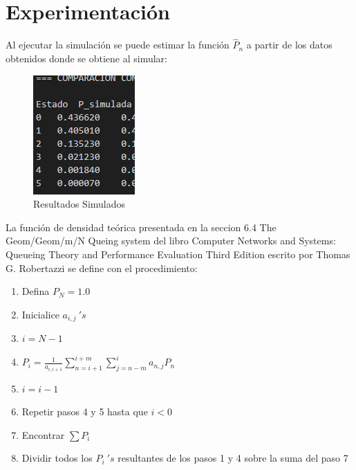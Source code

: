 \documentclass{article}
\begin{document}


\section{Experimentación}\label{sec:exp}

Al ejecutar la simulación se puede estimar la función $\hat P_n$ a partir de los datos obtenidos donde se obtiene al simular:
\begin{figure}[H]
    \centering
    \includegraphics[width=0.5\linewidth]{images/imageGeoGeoMCalc.png}
    \caption{Resultados Simulados}
    \label{fig:enter-label}
\end{figure}

La función de densidad teórica presentada en la seccion 6.4 The Geom/Geom/m/N Queing system del libro Computer Networks and Systems: Queueing Theory and Performance Evaluation Third Edition escrito por Thomas G. Robertazzi se define con el procedimiento:

\begin{enumerate}
    \item Defina $P_N = 1.0$
    \item Inicialice $a_{i,j}\ 's$
    \item $i = N-1$
    \item $	P_i=\frac{1}{a_{i,i+1}}\sum_{n=i+1}^{i+m}\sum_{j=n-m}^{i}{a_{n,j}P_n}$
    \item $i=i-1$
    \item Repetir pasos 4 y 5 hasta que $i<0$
    \item Encontrar $\sum {P_i}$
    \item Dividir todos los $P_i\ 's$ resultantes de los pasos 1 y 4 sobre la suma del paso 7
\end{enumerate}
\end{document}
